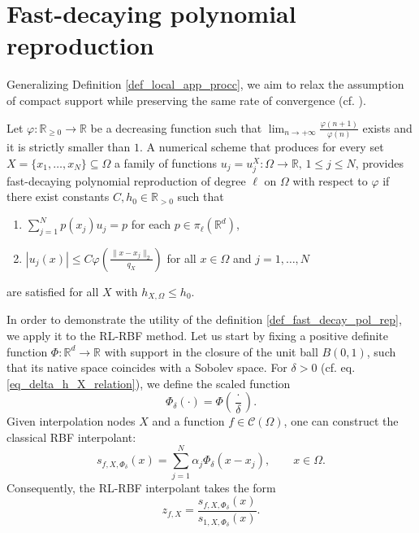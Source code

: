 \documentclass{drna}
\begin{document}
\section{Fast-decaying polynomial reproduction}
\label{sec_stability_convergence}
Generalizing Definition \ref{def_local_app_procc}, we aim to relax the assumption of compact support while preserving the same rate of convergence (cf. \cite[Theorem 3.2]{wendland_2004}).
\begin{definition}
Let  $\varphi : \mathbb{R}_{\geq 0} \rightarrow \mathbb{R}$ be a decreasing function such that $\lim_{n\to +\infty} \frac{\varphi(n+1)}{\varphi(n)}$ exists and it is strictly smaller than $1$. A numerical scheme that produces for every set $X=\{ x_1, \dots, x_N\} \subseteq \Omega$ a family of functions $u_j = u_j^X : \Omega \rightarrow \mathbb{R}, \, 1 \leq j \leq N$, provides fast-decaying polynomial reproduction of degree $\ell$ on $\Omega$ with respect to $\varphi$ if there exist constants $C,h_0 \in \mathbb{R}_{>0}$ such that
	\begin{enumerate}
		\item $\sum_{j=1}^{N} p(x_j)u_j = p$ for each $p \in \pi_{\ell}(\mathbb{R}^d)$,
		\item $|u_j(x)| \leq C\varphi\left(\frac{\|x-x_j\|_2}{q_X}\right)$ for all $x \in \Omega$ and $j=1,\dots,N$
	\end{enumerate}
are satisfied for all $X$ with $h_{X,\Omega} \leq h_0$.
\label{def_fast_decay_pol_rep}
\end{definition}
\noindent In order to demonstrate the utility of the  definition \ref{def_fast_decay_pol_rep}, we apply it to the RL-RBF method. Let us start by fixing a positive definite function $\Phi : \mathbb{R}^d \rightarrow \mathbb{R}$ with support in the closure of the unit ball $B(0,1)$, such that its native space coincides with a Sobolev space. For $\delta>0$ (cf. eq. \eqref{eq_delta_h_X_relation}), we define the scaled function
\begin{equation*}
    \Phi_\delta(\cdot) = \Phi \left( \frac{\cdot}{\delta}\right).
\end{equation*}
Given interpolation nodes $X$ and a function $f \in \mathcal{C}(\Omega)$, one can construct the classical RBF interpolant:
\begin{equation} \label{RBF_RLRBF_interp_problem}
    s_{f,X,\Phi_\delta}(x) = \sum_{j=1}^N \alpha_j \Phi_\delta(x-x_j), \qquad x \in \Omega.
\end{equation}
Consequently, the RL-RBF interpolant takes the form
\begin{equation} \label{RL_RBF_approximant_definition_001}
    z_{f,X}=\frac{ s_{f,X,\Phi_\delta}(x)}{ s_{1,X,\Phi_\delta}(x)}.
\end{equation}
\end{document}
